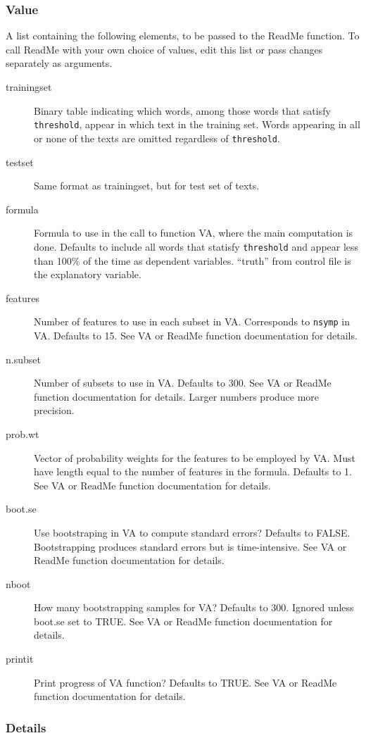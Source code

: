 \documentclass[oneside,letterpaper,titlepage]{article}
\begin{document}
\subsubsection{Value}
A list containing the following elements, to be passed to the ReadMe
function.  To call ReadMe with your own choice of values, edit this list
or pass changes separately as arguments.
\begin{description}
\item[trainingset] Binary table indicating which words, among those
  words that satisfy \texttt{threshold}, appear in which text in the
  training set.  Words appearing in all or none of the texts are
  omitted regardless of \texttt{threshold}.
\item[testset] Same format as trainingset, but for test set of texts.
\item[formula] Formula to use in the call to function VA, where the
  main computation is done. Defaults to include all words that
  statisfy \texttt{threshold} and appear less than 100\% of the time as
  dependent variables.  ``truth'' from control file is the explanatory
  variable.
\item[features] Number of features to use in each subset in VA.
  Corresponds to \texttt{nsymp} in VA. Defaults to 15. See VA or
  ReadMe function documentation for details.
\item[n.subset] Number of subsets to use in VA. Defaults to 300.  See
  VA or ReadMe function documentation for details.  Larger numbers
  produce more precision.
\item[prob.wt] Vector of probability weights for the features to be
employed by VA. Must have length equal to the number of features in
the formula.  Defaults to 1.  See VA or ReadMe function documentation
for details.
\item[boot.se] Use bootstraping in VA to compute standard errors?
  Defaults to FALSE.  Bootstrapping produces standard errors but is
  time-intensive.  See VA or ReadMe function documentation for
  details.
\item[nboot] How many bootstrapping samples for VA? Defaults to 300.
  Ignored unless boot.se set to TRUE. See VA or ReadMe function
  documentation for details.
\item[printit] Print progress of VA function? Defaults to TRUE. See VA
  or ReadMe function documentation for details.
\end{description}

\subsubsection{Details}
\end{document}
